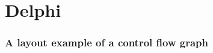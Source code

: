 \documentclass{beamer}
\begin{document}

\section{Delphi}
\begin{frame}
\frametitle{A layout example of a control flow graph}
\begin{figure}[htbp]
	\begin{minipage}[b]{0.49\linewidth}
	\end{minipage}
\hfill
\begin{minipage}[b]{0.49\linewidth}

\end{minipage}
\end{figure}
\end{frame}
\end{document}
